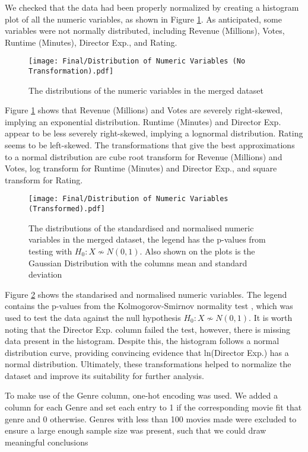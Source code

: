         We checked that the data had been properly normalized by creating a
        histogram plot of all the numeric variables, as shown in Figure
        \ref*{fig-distribution-of-numeric-variable}. As anticipated, some
        variables were not normally distributed, including Revenue (Millions),
        Votes, Runtime (Minutes), Director Exp., and Rating.
        \begin{figure}[H]
            \centering
            \texttt{[image: Final/Distribution of Numeric Variables (No Transformation).pdf]}
            \caption[short]{The distributions of the numeric variables in the merged dataset}\label{fig-distribution-of-numeric-variable}
        \end{figure}
        Figure \ref*{fig-distribution-of-numeric-variable} shows that Revenue (Millions) and Votes are
        severely right-skewed, implying an exponential distribution. Runtime
        (Minutes) and Director Exp. appear to be less severely right-skewed,
        implying a lognormal distribution. Rating seems to be left-skewed. The
        transformations that give the best approximations to a normal
        distribution are cube root transform for Revenue (Millions) and Votes,
        log transform for Runtime (Minutes) and Director Exp., and square
        transform for Rating.
        \begin{figure}[H]
            \centering
            \texttt{[image: Final/Distribution of Numeric Variables (Transformed).pdf]}
            \caption[short]{The distributions of the standardised and normalised numeric variables in the merged dataset,
                            the legend has the p-values from testing with $H_{0}: X \not\sim N(0,1)$. Also shown on the plots is
                            the Gaussian Distribution with the columns mean and standard deviation}\label{fig-transformed-distribution-of-numeric-variable}
        \end{figure}
        Figure \ref*{fig-transformed-distribution-of-numeric-variable} shows the
        standarised and normalised numeric variables. The legend contains the p-values
        from the Kolmogorov-Smirnov normality test \cite*{KStest}, which was used to
        test the data against the null hypothesis $H_{0}: X \not\sim N(0,1)$. It is
        worth noting that the Director Exp. column failed the test, however, there is
        missing data present in the histogram. Despite this, the histogram follows a
        normal distribution curve, providing convincing evidence that ln(Director Exp.)
        has a normal distribution. Ultimately, these transformations helped to normalize
        the dataset and improve its suitability for further analysis.

        To make use of the Genre column, one-hot encoding was used.
        We added a column for each Genre and set each entry to 1 if the corresponding movie
            fit that genre and 0 otherwise.
        Genres with less than 100 movies made were excluded to ensure a large enough sample size
            was present, such that we could draw meaningful conclusions